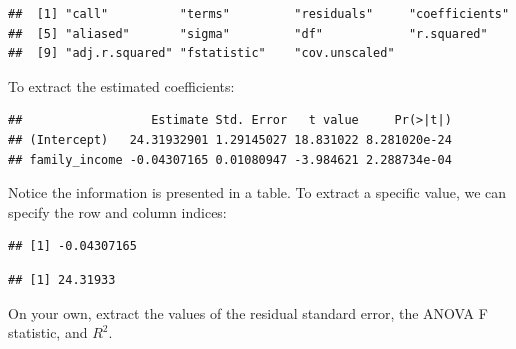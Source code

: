 \documentclass[
]{book}
\newenvironment{Shaded}{\begin{snugshade}}{\end{snugshade}}
\newcommand{\DecValTok}[1]{\textcolor[rgb]{0.00,0.00,0.81}{#1}}
\newcommand{\DocumentationTok}[1]{\textcolor[rgb]{0.56,0.35,0.01}{\textbf{\textit{#1}}}}
\newcommand{\FunctionTok}[1]{\textcolor[rgb]{0.13,0.29,0.53}{\textbf{#1}}}
\newcommand{\NormalTok}[1]{#1}
\newcommand{\SpecialCharTok}[1]{\textcolor[rgb]{0.81,0.36,0.00}{\textbf{#1}}}
\begin{document}
\begin{verbatim}
##  [1] "call"          "terms"         "residuals"     "coefficients" 
##  [5] "aliased"       "sigma"         "df"            "r.squared"    
##  [9] "adj.r.squared" "fstatistic"    "cov.unscaled"
\end{verbatim}

To extract the estimated coefficients:

\begin{Shaded}
\end{Shaded}

\begin{verbatim}
##                  Estimate Std. Error   t value     Pr(>|t|)
## (Intercept)   24.31932901 1.29145027 18.831022 8.281020e-24
## family_income -0.04307165 0.01080947 -3.984621 2.288734e-04
\end{verbatim}

Notice the information is presented in a table. To extract a specific value, we can specify the row and column indices:

\begin{Shaded}
\end{Shaded}

\begin{verbatim}
## [1] -0.04307165
\end{verbatim}

\begin{Shaded}
\end{Shaded}

\begin{verbatim}
## [1] 24.31933
\end{verbatim}

On your own, extract the values of the residual standard error, the ANOVA F statistic, and \(R^2\).
\end{document}
